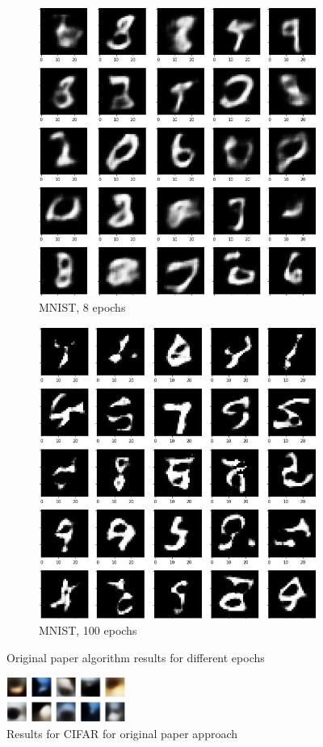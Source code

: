 \documentclass{article}
\begin{document}
    \begin{center}
        \begin{figure}[H]{\textwidth}
            \begin{subfigure}{0.5\textwidth}
                \centering
                \includegraphics[width=0.35\linewidth]{figures/epoch8.png}
                \caption{MNIST, 8 epochs}
            \end{subfigure}
            \begin{subfigure}{0.5\textwidth}
                \centering
                \includegraphics[width=0.35\linewidth]{figures/epoch100.png}
                \caption{MNIST, 100 epochs}
            \end{subfigure}%
            \caption{Original paper algorithm results for different epochs}
        \end{figure}
    \end{center}

    \begin{center}
        \begin{figure}[H]
            \centering
            \includegraphics[width=0.35\textwidth]{figures/CIFAR-original-alexander.png}
            \caption{Results for CIFAR for original paper approach}
        \end{figure}
    \end{center}
\end{document}
